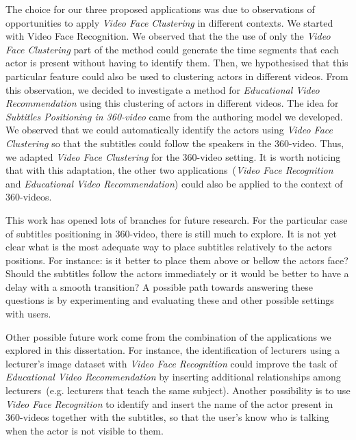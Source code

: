 The choice for our three proposed applications was due to observations of opportunities to apply \emph{Video Face Clustering} in different contexts. We started with Video Face Recognition. We observed that the the use of only the \emph{Video Face Clustering} part of the method could generate the time segments that each actor is present without having to identify them. Then, we hypothesised that this particular feature could also be used to clustering actors in different videos. From this observation, we decided to investigate a method for \emph{Educational Video Recommendation} using this clustering of actors in different videos. The idea for \emph{Subtitles Positioning in 360-video} came from the authoring model we developed. We observed that we could automatically identify the actors using \emph{Video Face Clustering} so that the subtitles could follow the speakers in the 360-video. Thus, we adapted \emph{Video Face Clustering} for the 360-video setting. It is worth noticing that with this adaptation, the other two applications~(\emph{Video Face Recognition} and \emph{Educational Video Recommendation}) could also be applied to the context of 360-videos.

This work has opened lots of branches for future research. For the particular case of subtitles positioning in 360-video, there is still much to explore. It is not yet clear what is the most adequate way to place subtitles relatively to the actors positions. For instance: is it better to place them above or bellow the actors face? Should the subtitles follow the actors immediately or it would be better to have a delay with a smooth transition? A possible path towards answering these questions is by experimenting and evaluating these and other possible settings with users.

Other possible future work come from the combination of the applications we explored in this dissertation. For instance, the identification of lecturers using a lecturer's image dataset with \emph{Video Face Recognition} could improve the task of \emph{Educational Video Recommendation} by inserting additional relationships among lecturers~(e.g. lecturers that teach the same subject). Another possibility is to use \emph{Video Face Recognition} to identify and insert the name of the actor present in 360-videos together with the subtitles, so that the user's know who is talking when the actor is not visible to them.


